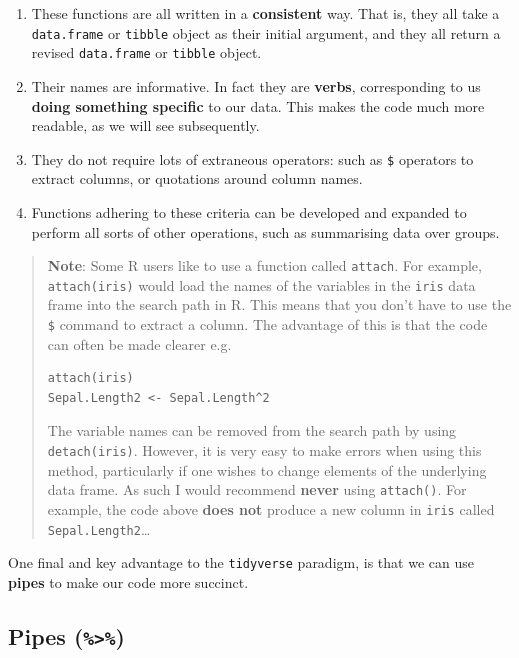 \documentclass[]{book}
\providecommand{\tightlist}{%
  \setlength{\itemsep}{0pt}\setlength{\parskip}{0pt}}
\theoremstyle{definition}
\theoremstyle{definition}
\theoremstyle{definition}
\theoremstyle{remark}
\begin{document}
\begin{enumerate}
\def\labelenumi{\arabic{enumi}.}
\tightlist
\item
  These functions are all written in a \textbf{consistent} way. That is,
  they all take a \texttt{data.frame} or \texttt{tibble} object as their
  initial argument, and they all return a revised \texttt{data.frame} or
  \texttt{tibble} object.
\item
  Their names are informative. In fact they are \textbf{verbs},
  corresponding to us \textbf{doing something specific} to our data.
  This makes the code much more readable, as we will see subsequently.
\item
  They do not require lots of extraneous operators: such as \texttt{\$}
  operators to extract columns, or quotations around column names.
\item
  Functions adhering to these criteria can be developed and expanded to
  perform all sorts of other operations, such as summarising data over
  groups.
\end{enumerate}

\begin{quote}
\textbf{Note}: Some R users like to use a function called
\texttt{attach}. For example, \texttt{attach(iris)} would load the names
of the variables in the \texttt{iris} data frame into the search path in
R. This means that you don't have to use the \texttt{\$} command to
extract a column. The advantage of this is that the code can often be
made clearer e.g.

\begin{verbatim}
attach(iris)
Sepal.Length2 <- Sepal.Length^2
\end{verbatim}

The variable names can be removed from the search path by using
\texttt{detach(iris)}. However, it is very easy to make errors when
using this method, particularly if one wishes to change elements of the
underlying data frame. As such I would recommend \textbf{never} using
\texttt{attach()}. For example, the code above \textbf{does not} produce
a new column in \texttt{iris} called \texttt{Sepal.Length2}\ldots{}
\end{quote}

One final and key advantage to the \texttt{tidyverse} paradigm, is that
we can use \textbf{pipes} to make our code more succinct.

\subsection{\texorpdfstring{Pipes
(\texttt{\%\textgreater{}\%})}{Pipes (\%\textgreater{}\%)}}\label{pipes}
\end{document}
